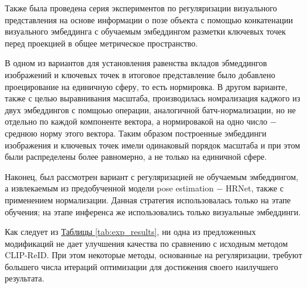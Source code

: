 Также была проведена серия экспериментов по регуляризации визуального представления на основе информации о позе объекта с помощью конкатенации визуального эмбеддинга с обучаемым эмбеддингом разметки ключевых точек перед проекцией в общее метрическое пространство. 

В одном из вариантов для установления равенства вкладов эбмеддингов изображений и ключевых точек в итоговое представление было добавлено проецирование на единичную сферу, то есть нормировка. В другом варианте, также с целью выравнивания масштаба, производилась номрализация каджого из двух эмбеддингов с помщоью операции, аналогичной батч-нормализации, но не отдельно по каждой компоненте вектора, а нормировакой на одно число $-$ среднюю норму этого вектора. Таким образом построенные эмбеддинги изображения и ключевых точек имели одинаковый порядок масштаба и при этом были распределены более равномерно, а не только на единичной сфере.

Наконец, был рассмотрен вариант с регуляризацией не обучаемым эмбеддингом, а извлекаемым из предобученной модели pose estimation $-$ HRNet, также с применением нормализации. Данная стратегия использовалась только на этапе обучения; на этапе инференса же использовались только визуальные эмбеддинги.

Как следует из \hyperref[tab:exp_results]{Таблицы \ref*{tab:exp_results}}, ни одна из предложенных модификаций не дает улучшения качества по сравнению с исходным методом CLIP-ReID. При этом некоторые методы, основанные на регуляризации, требуют большего числа итераций оптимизации для достижения своего наилучшего результата.


